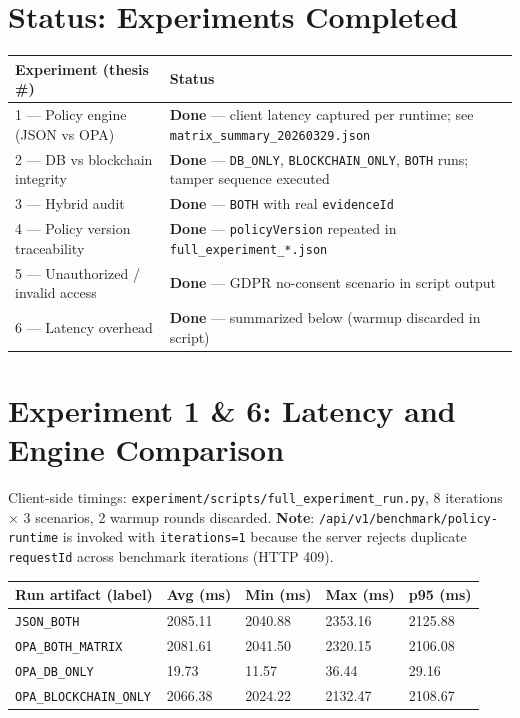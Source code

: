 \documentclass[11pt]{article}
\begin{document}
\section{Status: Experiments Completed}
\begin{longtable}{p{3cm}p{9cm}}
\toprule
Experiment (thesis \#) & Status \\
\midrule
1 --- Policy engine (JSON vs OPA) & \textbf{Done} --- client latency captured per runtime; see \texttt{matrix\_summary\_20260329.json} \\
2 --- DB vs blockchain integrity & \textbf{Done} --- \texttt{DB\_ONLY}, \texttt{BLOCKCHAIN\_ONLY}, \texttt{BOTH} runs; tamper sequence executed \\
3 --- Hybrid audit & \textbf{Done} --- \texttt{BOTH} with real \texttt{evidenceId} \\
4 --- Policy version traceability & \textbf{Done} --- \texttt{policyVersion} repeated in \texttt{full\_experiment\_*.json} \\
5 --- Unauthorized / invalid access & \textbf{Done} --- GDPR no-consent scenario in script output \\
6 --- Latency overhead & \textbf{Done} --- summarized below (warmup discarded in script) \\
\bottomrule
\end{longtable}

\section{Experiment 1 \& 6: Latency and Engine Comparison}
Client-side timings: \texttt{experiment/scripts/full\_experiment\_run.py}, 8 iterations $\times$ 3 scenarios, 2 warmup rounds discarded. \textbf{Note}: \texttt{/api/v1/benchmark/policy-runtime} is invoked with \texttt{iterations=1} because the server rejects duplicate \texttt{requestId} across benchmark iterations (HTTP 409).

\begin{longtable}{p{4.5cm}p{2cm}p{2cm}p{2cm}p{2.5cm}}
\toprule
Run artifact (label) & Avg (ms) & Min (ms) & Max (ms) & p95 (ms) \\
\midrule
\texttt{JSON\_BOTH} & 2085.11 & 2040.88 & 2353.16 & 2125.88 \\
\texttt{OPA\_BOTH\_MATRIX} & 2081.61 & 2041.50 & 2320.15 & 2106.08 \\
\texttt{OPA\_DB\_ONLY} & 19.73 & 11.57 & 36.44 & 29.16 \\
\texttt{OPA\_BLOCKCHAIN\_ONLY} & 2066.38 & 2024.22 & 2132.47 & 2108.67 \\
\bottomrule
\end{longtable}
\end{document}
